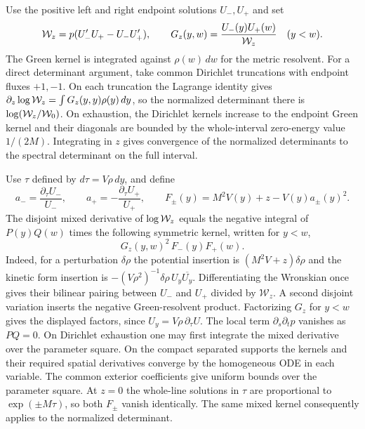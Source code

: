 \documentclass[11pt,letterpaper]{article}
\begin{document}
Use the positive left and right endpoint solutions $U_-,U_+$ and set
\[
 {\cal W}_z=p(U_-'U_+-U_-U_+'),\qquad
 G_z(y,w)=\frac{U_-(y)U_+(w)}{{\cal W}_z}\quad (y<w).
\]
The Green kernel is integrated against $\rho(w)\,dw$ for the metric resolvent. For a direct determinant argument, take common Dirichlet truncations with endpoint fluxes $+1,-1$. On each truncation the Lagrange identity gives $\partial_z\log {\cal W}_z=\int G_z(y,y)\rho(y)\,dy$, so the normalized determinant there is $\log({\cal W}_z/{\cal W}_0)$. On exhaustion, the Dirichlet kernels increase to the endpoint Green kernel and their diagonals are bounded by the whole-interval zero-energy value $1/(2M)$. Integrating in $z$ gives convergence of the normalized determinants to the spectral determinant on the full interval.

Use $\tau$ defined by $d\tau=V\rho\,dy$, and define
\[
 a_-=\frac{\partial_\tau U_-}{U_-},\qquad
 a_+=-\frac{\partial_\tau U_+}{U_+},\qquad
 F_\pm(y)=M^2V(y)+z-V(y)a_\pm(y)^2 .
\]
The disjoint mixed derivative of $\log{\cal W}_z$ equals the negative integral of $P(y)Q(w)$ times the following symmetric kernel, written for $y<w$,
\[
                 G_z(y,w)^2\,F_-(y)F_+(w).
\]
Indeed, for a perturbation $\delta\rho$ the potential insertion is $(M^2V+z)\delta\rho$ and the kinetic form insertion is $-(V\rho^2)^{-1}\delta\rho\,U_y\overline{U_y}$. Differentiating the Wronskian once gives their bilinear pairing between $U_-$ and $U_+$ divided by $\mathcal{W}_z$. A second disjoint variation inserts the negative Green-resolvent product. Factorizing $G_z$ for $y<w$ gives the displayed factors, since $U_y=V\rho\,\partial_\tau U$. The local term $\partial_s\partial_t p$ vanishes as $PQ=0$. On Dirichlet exhaustion one may first integrate the mixed derivative over the parameter square. On the compact separated supports the kernels and their required spatial derivatives converge by the homogeneous ODE in each variable. The common exterior coefficients give uniform bounds over the parameter square. At $z=0$ the whole-line solutions in $\tau$ are proportional to $\exp(\pm M\tau)$, so both $F_\pm$ vanish identically. The same mixed kernel consequently applies to the normalized determinant.
\end{document}
